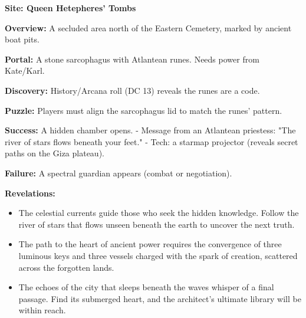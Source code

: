 \documentclass[12pt]{article}
\begin{document}
\textbf{Site: Queen Hetepheres' Tombs}

\textbf{Overview:}  
A secluded area north of the Eastern Cemetery, marked by ancient boat pits.

\textbf{Portal:}  
A stone sarcophagus with Atlantean runes. Needs power from Kate/Karl.

\textbf{Discovery:}  
History/Arcana roll (DC 13) reveals the runes are a code.

\textbf{Puzzle:}  
Players must align the sarcophagus lid to match the runes' pattern.

\textbf{Success:}  
A hidden chamber opens.  
- Message from an Atlantean priestess: "The river of stars flows beneath your feet."  
- Tech: a starmap projector (reveals secret paths on the Giza plateau).

\textbf{Failure:}  
A spectral guardian appears (combat or negotiation).

\textbf{Revelations:}
\begin{itemize}
  \item The celestial currents guide those who seek the hidden knowledge. Follow the river of stars that flows unseen beneath the earth to uncover the next truth.
  \item The path to the heart of ancient power requires the convergence of three luminous keys and three vessels charged with the spark of creation, scattered across the forgotten lands.
  \item The echoes of the city that sleeps beneath the waves whisper of a final passage. Find its submerged heart, and the architect's ultimate library will be within reach.
\end{itemize}
\end{document}
